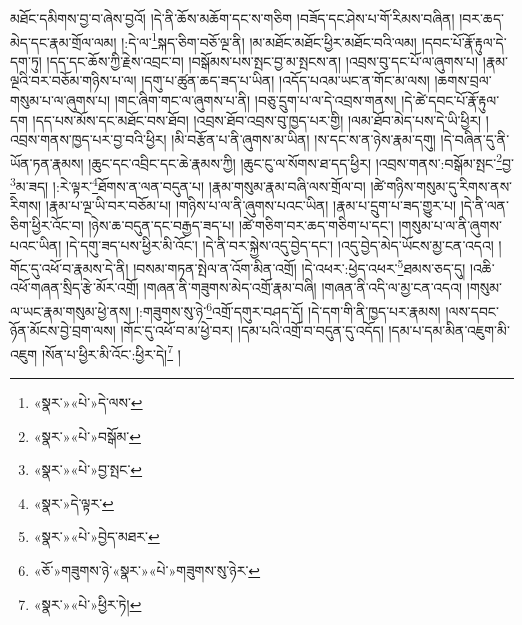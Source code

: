 མཐོང་དམིགས་བྱ་བ་ཞེས་བྱའོ། །དེ་ནི་ཆོས་མཆོག་དང་ས་གཅིག །བཟོད་དང་ཤེས་པ་གོ་རིམས་བཞིན། །བར་ཆད་མེད་དང་རྣམ་གྲོལ་ལམ། །:དེ་ལ་\footnote{«སྣར་»«པེ་»དེ་ལས་}སྐད་ཅིག་བཅོ་ལྔ་ནི། །མ་མཐོང་མཐོང་ཕྱིར་མཐོང་བའི་ལམ། །དབང་པོ་རྣོ་རྟུལ་དེ་དག་ཏུ། །དད་དང་ཆོས་ཀྱི་རྗེས་འབྲང་བ། །བསྒོམས་པས་སྤང་བྱ་མ་སྤངས་ན། །འབྲས་བུ་དང་པོ་ལ་ཞུགས་པ། །རྣམ་ལྔའི་བར་བཅོམ་གཉིས་པ་ལ། །དགུ་པ་ཚུན་ཆད་ཟད་པ་ཡིན། །འདོད་པའམ་ཡང་ན་གོང་མ་ལས། །ཆགས་བྲལ་གསུམ་པ་ལ་ཞུགས་པ། །གང་ཞིག་གང་ལ་ཞུགས་པ་ནི། །བཅུ་དྲུག་པ་ལ་དེ་འབྲས་གནས། །དེ་ཚེ་དབང་པོ་རྣོ་རྟུལ་དག །དད་པས་མོས་དང་མཐོང་བས་ཐོབ། །འབྲས་ཐོབ་འབྲས་བུ་ཁྱད་པར་གྱི། །ལམ་ཐོབ་མེད་པས་དེ་ཡི་ཕྱིར། །འབྲས་གནས་ཁྱད་པར་བྱ་བའི་ཕྱིར། །མི་བརྩོན་པ་ནི་ཞུགས་མ་ཡིན། །ས་དང་ས་ན་ཉེས་རྣམ་དགུ། །དེ་བཞིན་དུ་ནི་ཡོན་ཏན་རྣམས། །ཆུང་དང་འབྲིང་དང་ཆེ་རྣམས་ཀྱི། །ཆུང་ངུ་ལ་སོགས་ཐ་དད་ཕྱིར། །འབྲས་གནས་:བསྒོམ་སྤང་\footnote{«སྣར་»«པེ་»བསྒོམ་}བྱ་\footnote{«སྣར་»«པེ་»བྱ་སྤང་}མ་ཟད། །:རེ་ལྟར་\footnote{«སྣར་»དེ་ལྟར་}ཐོགས་ན་ལན་བདུན་པ། །རྣམ་གསུམ་རྣམ་བཞི་ལས་གྲོལ་བ། །ཚེ་གཉིས་གསུམ་དུ་རིགས་ནས་རིགས། །རྣམ་པ་ལྔ་ཡི་བར་བཅོམ་པ། །གཉིས་པ་ལ་ནི་ཞུགས་པའང་ཡིན། །རྣམ་པ་དྲུག་པ་ཟད་གྱུར་པ། །དེ་ནི་ལན་ཅིག་ཕྱིར་འོང་བ། །ཉེས་ཆ་བདུན་དང་བརྒྱད་ཟད་པ། །ཚེ་གཅིག་བར་ཆད་གཅིག་པ་དང་། །གསུམ་པ་ལ་ནི་ཞུགས་པའང་ཡིན། །དེ་དགུ་ཟད་པས་ཕྱིར་མི་འོང་། །དེ་ནི་བར་སྐྱེས་འདུ་བྱེད་དང་། །འདུ་བྱེད་མེད་ཡོངས་མྱ་ངན་འདའ། །གོང་དུ་འཕོ་བ་རྣམས་དེ་ནི། །བསམ་གཏན་སྤེལ་ན་འོག་མིན་འགྲོ། །དེ་འཕར་:ཕྱེད་འཕར་\footnote{«སྣར་»«པེ་»བྱེད་མཐར་}ཐམས་ཅད་དུ། །འཆི་འཕོ་གཞན་སྲིད་རྩེ་མོར་འགྲོ། །གཞན་ནི་གཟུགས་མེད་འགྲོ་རྣམ་བཞི། །གཞན་ནི་འདི་ལ་མྱ་ངན་འདའ། །གསུམ་ལ་ཡང་རྣམ་གསུམ་ཕྱེ་ནས། །:གཟུགས་སུ་ཉེ་\footnote{«ཅོ་»གཟུགས་ཉེ་«སྣར་»«པེ་»གཟུགས་སུ་ཉེར་}འགྲོ་དགུར་བཤད་དོ། །དེ་དག་གི་ནི་ཁྱད་པར་རྣམས། །ལས་དབང་ཉོན་མོངས་བྱེ་བྲག་ལས། །གོང་དུ་འཕོ་བ་མ་ཕྱེ་བར། །དམ་པའི་འགྲོ་བ་བདུན་དུ་འདོད། །དམ་པ་དམ་མིན་འཇུག་མི་འཇུག །སོན་པ་ཕྱིར་མི་འོང་:ཕྱིར་དེ།\footnote{«སྣར་»«པེ་»ཕྱིར་ཏེ།} །
